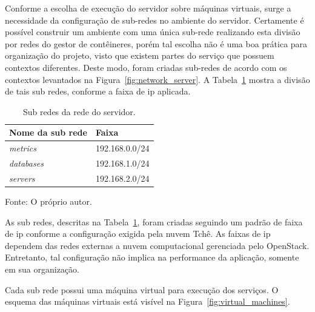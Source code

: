 Conforme a escolha de execução do servidor sobre máquinas virtuais, surge a necessidade da configuração de sub-redes no ambiente do servidor.
%
Certamente é possível construir um ambiente com uma única sub-rede realizando esta divisão por redes do gestor de contêineres, porém tal escolha não é uma boa prática para organização do projeto, visto que existem partes do serviço que possuem contextos diferentes.
%
Deste modo, foram criadas sub-redes de acordo com os contextos levantados na Figura~\ref{fig:network_server}.
%
A Tabela~\ref{tab:subredes} mostra a divisão de tais sub redes, conforme a faixa de \ac{ip} aplicada.



\begin{table}[htb!]
\centering
\begin{adjustbox}{max width=\textwidth}
\caption{Sub redes da rede do servidor.}
\label{tab:subredes}
\begin{tabular}{l|l}
\hline \hline
Nome da sub rede & Faixa          \\ \hline \hline
\textit{metrics}         & 192.168.0.0/24 \\ \hline
\textit{databases}       & 192.168.1.0/24 \\ \hline
\textit{servers}         & 192.168.2.0/24 \\ \hline \hline
\end{tabular}
\end{adjustbox}

Fonte: O próprio autor.
\end{table}



As sub redes, descritas na Tabela~\ref{tab:subredes}, foram criadas seguindo um padrão de faixa de \ac{ip} conforme a configuração exigida pela nuvem Tchê.
%
As faixas de \ac{ip} dependem das redes externas a nuvem computacional gerenciada pelo OpenStack.
%
Entretanto, tal configuração não implica na performance da aplicação, somente em sua organização.

Cada sub rede possui uma máquina virtual para execução dos serviços.
%
O esquema das máquinas virtuais está visível na Figura~\ref{fig:virtual_machines}.




